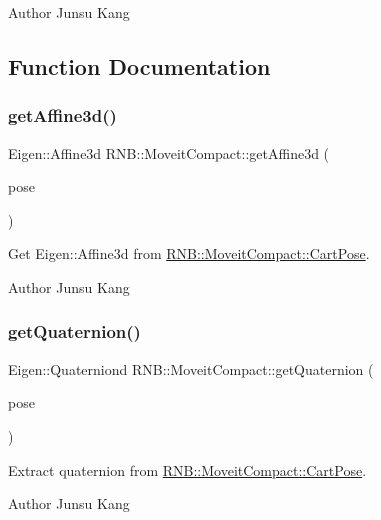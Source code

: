 \begin{DoxyAuthor}{Author}
Junsu Kang 
\end{DoxyAuthor}


\subsection{Function Documentation}
\mbox{\label{namespace_r_n_b_1_1_moveit_compact_a7428e08b7f80d96545b3e82eef22d52e}} 
\subsubsection{\texorpdfstring{get\+Affine3d()}{getAffine3d()}}
{\footnotesize\ttfamily Eigen\+::\+Affine3d R\+N\+B\+::\+Moveit\+Compact\+::get\+Affine3d (\begin{DoxyParamCaption}\item[{\hyperlink{class_r_n_b_1_1_moveit_compact_1_1_cart_pose}{Cart\+Pose}}]{pose }\end{DoxyParamCaption})}



Get Eigen\+::\+Affine3d from \hyperlink{class_r_n_b_1_1_moveit_compact_1_1_cart_pose}{R\+N\+B\+::\+Moveit\+Compact\+::\+Cart\+Pose}. 

\begin{DoxyAuthor}{Author}
Junsu Kang 
\end{DoxyAuthor}
\mbox{\label{namespace_r_n_b_1_1_moveit_compact_a54930af2dcdc8fc1cf279e850baf5fba}} 
\subsubsection{\texorpdfstring{get\+Quaternion()}{getQuaternion()}}
{\footnotesize\ttfamily Eigen\+::\+Quaterniond R\+N\+B\+::\+Moveit\+Compact\+::get\+Quaternion (\begin{DoxyParamCaption}\item[{\hyperlink{class_r_n_b_1_1_moveit_compact_1_1_cart_pose}{Cart\+Pose}}]{pose }\end{DoxyParamCaption})}



Extract quaternion from \hyperlink{class_r_n_b_1_1_moveit_compact_1_1_cart_pose}{R\+N\+B\+::\+Moveit\+Compact\+::\+Cart\+Pose}. 

\begin{DoxyAuthor}{Author}
Junsu Kang 
\end{DoxyAuthor}
